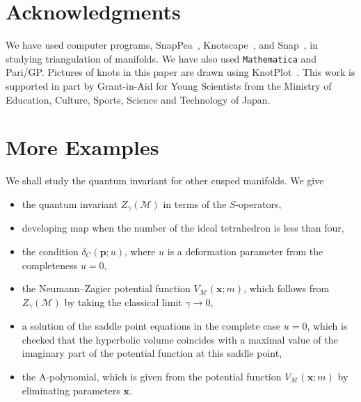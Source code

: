 \documentclass[12pt,reqno]{amsart}
\numberwithin{equation}{section}
\begin{document}
\section*{Acknowledgments}

We have used computer programs,
SnapPea~\cite{SnapPea99}, Knotscape~\cite{Knotscape99}, and
Snap~\cite{CouGooHodNeu00a}, in studying triangulation of manifolds.
We have also used \texttt{Mathematica} and Pari/GP.
Pictures of knots in this paper are drawn using KnotPlot~\cite{KnotPlot}.
This work is supported in part  by Grant-in-Aid for Young Scientists
from the Ministry of Education, Culture, Sports, Science and
Technology of Japan.





\appendix
\section{More Examples}

We shall study the quantum invariant for other cusped manifolds.
We give 
\begin{itemize}
\item 
  the quantum invariant $Z_\gamma(\mathcal{M})$ in terms of the
  $S$-operators,

\item 
  developing map when the number of the ideal tetrahedron is less than
  four,

\item
  the  condition $\delta_C(\boldsymbol{p};u)$, where $u$
  is a deformation parameter from the completeness $u=0$,

\item 
  the Neumann--Zagier  potential function
  $V_\mathcal{M}(\boldsymbol{x} ; m)$,
  which follows from $Z_\gamma(\mathcal{M})$
  by taking the classical limit $\gamma\to 0$,

\item a solution of the saddle point equations in the complete case
  $u=0$,
  which is checked
  that  the hyperbolic volume coincides with a maximal
  value of the imaginary part of the potential function at this saddle
  point,



\item the A-polynomial, which is given from the potential function
  $V_\mathcal{M}(\boldsymbol{x};m)$ by eliminating parameters
  $\boldsymbol{x}$.

\end{itemize}
\end{document}
